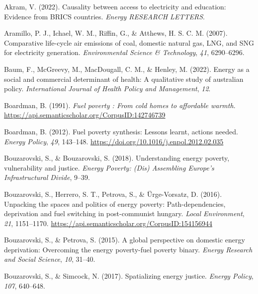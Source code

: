 \documentclass[
  twoside,
  openright,
  degree    = master,               %
  language  = english,              %
  fontset   = overleaf,             %
  watermark = true,                 %
  doi       = true,                 %
]{ntuthesis}
\newlength{\cslhangindent}
\newlength{\cslentryspacingunit} %
\newenvironment{CSLReferences}[2] %
 {%
  \setlength{\parindent}{0pt}
  \ifodd #1
  \let\oldpar\par
  \def\par{\hangindent=\cslhangindent\oldpar}
  \fi
  \setlength{\parskip}{#2\cslentryspacingunit}
 }%
 {}
\begin{document}
\begin{CSLReferences}{1}{0}
\leavevmode{}%
Akram, V. (2022). Causality between access to electricity and education:
Evidence from BRICS countries. \emph{Energy RESEARCH LETTERS}.

\leavevmode{}%
Aramillo, P. J., Ichael, W. M., Riffin, G., \& Atthews, H. S. C. M.
(2007). Comparative life-cycle air emissions of coal, domestic natural
gas, LNG, and SNG for electricity generation. \emph{Environmental
Science \& Technology}, \emph{41}, 6290--6296.

\leavevmode{}%
Baum, F., McGreevy, M., MacDougall, C. M., \& Henley, M. (2022). Energy
as a social and commercial determinant of health: A qualitative study of
australian policy. \emph{International Journal of Health Policy and
Management}, \emph{12}.

\leavevmode{}%
Boardman, B. (1991). \emph{Fuel poverty : From cold homes to affordable
warmth}. \url{https://api.semanticscholar.org/CorpusID:142746739}

\leavevmode{}%
Boardman, B. (2012). Fuel poverty synthesis: Lessons learnt, actions
needed. \emph{Energy Policy}, \emph{49}, 143--148.
\url{https://doi.org/10.1016/j.enpol.2012.02.035}

\leavevmode{}%
Bouzarovski, S., \& Bouzarovski, S. (2018). Understanding energy
poverty, vulnerability and justice. \emph{Energy Poverty: (Dis)
Assembling Europe's Infrastructural Divide}, 9--39.

\leavevmode{}%
Bouzarovski, S., Herrero, S. T., Petrova, S., \& Ürge-Vorsatz, D.
(2016). Unpacking the spaces and politics of energy poverty:
Path-dependencies, deprivation and fuel switching in post-communist
hungary. \emph{Local Environment}, \emph{21}, 1151--1170.
\url{https://api.semanticscholar.org/CorpusID:154156944}

\leavevmode{}%
Bouzarovski, S., \& Petrova, S. (2015). A global perspective on domestic
energy deprivation: Overcoming the energy poverty-fuel poverty binary.
\emph{Energy Research and Social Science}, \emph{10}, 31--40.

\leavevmode{}%
Bouzarovski, S., \& Simcock, N. (2017). Spatializing energy justice.
\emph{Energy Policy}, \emph{107}, 640--648.


\end{CSLReferences}
\end{document}
